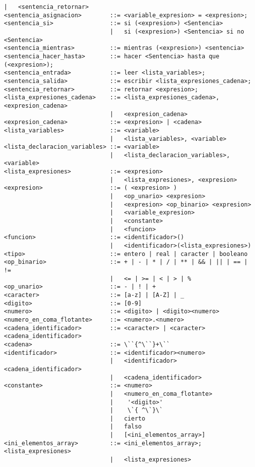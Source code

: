 \begin{lstlisting}[breaklines=true, basicstyle=\tiny]
                              |   <sentencia_retornar>
<sentencia_asignacion>        ::= <variable_expresion> = <expresion>;
<sentencia_si>                ::= si (<expresion>) <Sentencia>
                              |   si (<expresion>) <Sentencia> si no <Sentencia>
<sentencia_mientras>          ::= mientras (<expresion>) <sentencia>
<sentencia_hacer_hasta>       ::= hacer <Sentencia> hasta que (<expresion>);
<sentencia_entrada>           ::= leer <lista_variables>;
<sentencia_salida>            ::= escribir <lista_expresiones_cadena>;
<sentencia_retornar>          ::= retornar <expresion>;
<lista_expresiones_cadena>    ::= <lista_expresiones_cadena>, <expresion_cadena>
                              |   <expresion_cadena>
<expresion_cadena>            ::= <expresion> | <cadena>
<lista_variables>             ::= <variable>
                              |   <lista_variables>, <variable>
<lista_declaracion_variables> ::= <variable>
                              |   <lista_declaracion_variables>, <variable>
<lista_expresiones>           ::= <expresion>
                              |   <lista_expresiones>, <expresion>
<expresion>                   ::= ( <expresion> )
                              |   <op_unario> <expresion>
                              |   <expresion> <op_binario> <expresion>
                              |   <variable_expresion>
                              |   <constante>
                              |   <funcion>
<funcion>                     ::= <identificador>()
                              |   <identificador>(<lista_expresiones>)
<tipo>                        ::= entero | real | caracter | booleano
<op_binario>                  ::= + | - | * | / | ** | && | || | == | !=
                              |   <= | >= | < | > | %
<op_unario>                   ::= - | ! | +
<caracter>                    ::= [a-z] | [A-Z] | _
<digito>                      ::= [0-9]
<numero>                      ::= <digito> | <digito><numero>
<numero_en_coma_flotante>     ::= <numero>.<numero>
<cadena_identificador>        ::= <caracter> | <caracter><cadena_identificador>
<cadena>                      ::= \``{^\``}+\`` 
<identificador>               ::= <identificador><numero>
                              |   <identificador><cadena_identificador>
                              |   <cadena_identificador>
<constante>                   ::= <numero>
                              |   <numero_en_coma_flotante>
                              |    '<digito>'
                              |    \`{ ^\`}\`
                              |   cierto
                              |   falso
                              |   [<ini_elementos_array>]
<ini_elementos_array>         ::= <ini_elementos_array>; <lista_expresiones>
                              |   <lista_expresiones>
\end{lstlisting}


